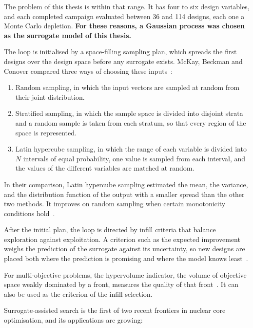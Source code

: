 The problem of this thesis is within that range. It has four to six
design variables, and each completed campaign evaluated between 36 and
114 designs, each one a Monte Carlo depletion. \textbf{For these reasons, a
Gaussian process was chosen as the surrogate model of this thesis.}

The loop is initialised by a space-filling sampling plan, which spreads
the first designs over the design space before any surrogate exists.
McKay, Beckman and Conover compared three ways of choosing these
inputs~\cite{mckay_lhs_1979}:

\begin{enumerate}
  \item Random sampling, in which the input vectors are sampled at random
        from their joint distribution.

  \item Stratified sampling, in which the sample space is divided into
        disjoint strata and a random sample is taken from each stratum,
        so that every region of the space is represented.

  \item Latin hypercube sampling, in which the range of each variable is
        divided into $N$ intervals of equal probability, one value is
        sampled from each interval, and the values of the different
        variables are matched at random.
\end{enumerate}

In their comparison, Latin hypercube sampling estimated the mean, the
variance, and the distribution function of the output with a smaller
spread than the other two methods. It improves on random sampling when
certain monotonicity conditions hold~\cite{mckay_lhs_1979}.

After the initial plan, the loop is directed by infill criteria that
balance exploration against exploitation. A criterion such as the
expected improvement weighs the prediction of the surrogate against its
uncertainty, so new designs are placed both where the prediction is
promising and where the model knows least~\cite{forrester_book_2008}.

For multi-objective problems, the hypervolume indicator, the volume of
objective space weakly dominated by a front, measures the quality of
that front~\cite{zitzler_2003_performance}. It can also be used as the
criterion of the infill selection.

Surrogate-assisted search is the first of two recent frontiers in
nuclear core optimisation, and its applications are growing:

